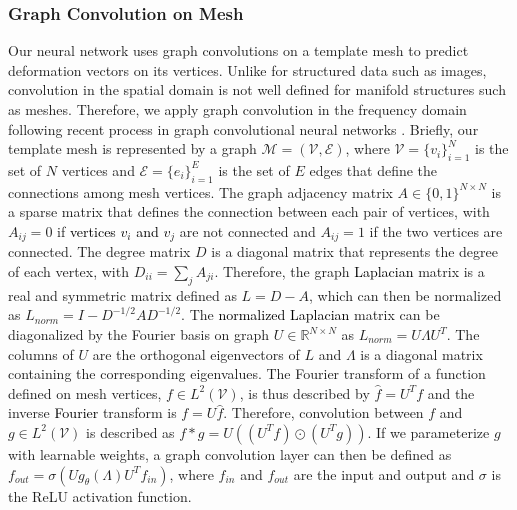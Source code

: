 \documentclass[times,review,preprint,authoryear]{elsarticle}
\begin{document}
\subsubsection{Graph Convolution on  Mesh}
Our neural network uses graph convolutions on a template mesh to predict deformation vectors on its vertices. Unlike for structured data such as images, convolution in the spatial domain is not well defined for manifold structures such as meshes. Therefore, we apply graph convolution in the frequency domain following recent process in graph convolutional neural networks \citep{Bronstein2017, Defferrard2016}. Briefly, our template mesh is represented by a graph $\mathcal{M} = (\mathcal{V}, \mathcal{E})$, where $\mathcal{V}=\{v_i\}_{i=1}^N$ is the set of $N$ vertices and $\mathcal{E}=\{e_i\}_{i=1}^E$ is the set of $E$ edges that define the connections among mesh vertices. The graph adjacency matrix $A \in \{0,1\}^{N\times N}$ is a sparse matrix that defines the connection between each pair of vertices, with $A_{ij}=0$ if \textcolor{black}{vertices $v_i$ and $v_j$} are not connected and $A_{ij}=1$ if the two vertices are connected. The degree matrix $D$ is a diagonal matrix that represents the degree of each vertex, with $D_{ii} = \sum_j A_{ji}$. Therefore, the graph \textcolor{black}{Laplacian} matrix is a real and symmetric matrix defined as $L = D-A$, which can then be normalized as $L_{norm} = I - D^{-1/2} A D^{-1/2}$. The \textcolor{black}{normalized Laplacian} matrix can be diagonalized by the Fourier basis on graph $U\in\mathbb{R}^{N\times N}$ as $L_{norm} = U\Lambda U^T$. The columns of $U$ are the orthogonal eigenvectors of $L$ and $\Lambda$ is a diagonal matrix containing the corresponding eigenvalues. The Fourier transform of a function defined on mesh vertices, $f \in L^2(\mathcal{V})$, is thus described by $\hat{f} = U^T f$ and the inverse \textcolor{black}{Fourier} transform is $f = U \hat{f}$. Therefore,  convolution between $f$ and $g \in L^2(\mathcal{V})$ is described as $f * g = U (( U^T f) \odot (U^T g))$. If we parameterize $g$ with learnable weights, a graph convolution layer can then be defined as $f_{out} = \sigma(U g_\theta(\Lambda)U^Tf_{in})$, where $f_{in}$ and $f_{out}$ are the input and output and $\sigma$ is the ReLU activation function. 
\end{document}
